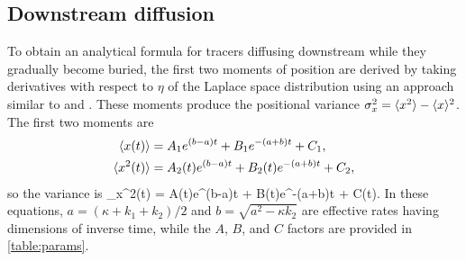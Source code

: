\subsection{Downstream diffusion}

To obtain an analytical formula for tracers diffusing downstream while they gradually become buried, the first two moments of position are derived by taking derivatives with respect to $\eta$ of the Laplace space distribution \DIFdelbegin \DIFdel{(\ref{eq:diffnicedist} ) }\DIFdelend \DIFaddbegin \DIFadd{\ref{eq:diffnicedist} }\DIFaddend using an approach similar to \citet{Shlesinger1974} and \citet{Weeks1998}. These moments produce the positional variance $\sigma_x^2 = \langle x^2\rangle - \langle x \rangle^2$. 
The first two moments are
\begin{align}
	\langle x(t) \rangle &= A_1 e^{(b-a)t}+B_1e^{-(a+b)t}+C_1, \label{eq:mean}\\
	\langle x^2(t) \rangle &= A_2(t)e^{(b-a)t}+B_2(t)e^{-(a+b)t}+C_2, \label{eq:second}
\end{align}
so the variance is 
\be \sigma_x^2(t) = A(t)e^{(b-a)t} + B(t)e^{-(a+b)t} + C(t). \label{eq:var}\ee
In these equations, $a = (\kappa + k_1+k_2)/2$ and $b = \sqrt{a^2-\kappa k_2}$ are effective rates having dimensions of inverse time, while the $A$, $B$, and $C$ factors are provided in \DIFdelbegin {}\DIFdelend \DIFaddbegin {}\DIFaddend \ref{table:params}.

